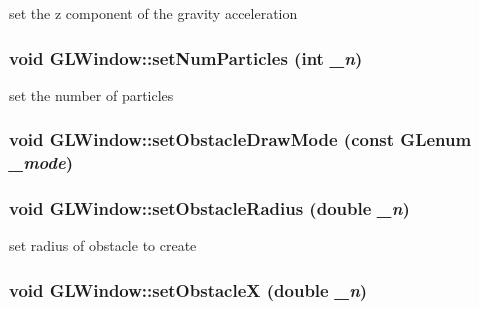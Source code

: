 set the z component of the gravity acceleration \hypertarget{classGLWindow_ab1b577a3ef506608f04a061db070799d}{
\subsubsection[{setNumParticles}]{\setlength{\rightskip}{0pt plus 5cm}void GLWindow::setNumParticles (int {\em \_\-n})}}
\label{classGLWindow_ab1b577a3ef506608f04a061db070799d}


set the number of particles \hypertarget{classGLWindow_a87f057e5282c7f11a86bdcf4a554db88}{
\subsubsection[{setObstacleDrawMode}]{\setlength{\rightskip}{0pt plus 5cm}void GLWindow::setObstacleDrawMode (const GLenum {\em \_\-mode})}}
\label{classGLWindow_a87f057e5282c7f11a86bdcf4a554db88}
\hypertarget{classGLWindow_aedb07f97bd356b5153e299709e69d625}{
\subsubsection[{setObstacleRadius}]{\setlength{\rightskip}{0pt plus 5cm}void GLWindow::setObstacleRadius (double {\em \_\-n})}}
\label{classGLWindow_aedb07f97bd356b5153e299709e69d625}


set radius of obstacle to create \hypertarget{classGLWindow_aaa93b03d03d1dc482730780645b7871c}{
\subsubsection[{setObstacleX}]{\setlength{\rightskip}{0pt plus 5cm}void GLWindow::setObstacleX (double {\em \_\-n})}}
\label{classGLWindow_aaa93b03d03d1dc482730780645b7871c}


